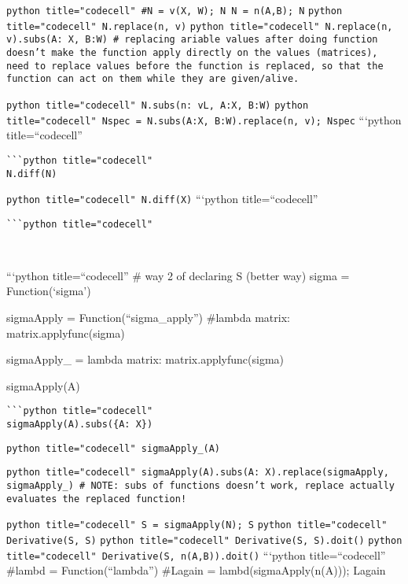 \documentclass[
]{article}
\begin{document}
\texttt{python title="codecell" #N = v(X, W); N N = n(A,B); N}
\texttt{python title="codecell" N.replace(n, v)}
\texttt{python title="codecell" N.replace(n, v).subs({A: X, B:W}) # replacing ariable values after doing function doesn't make the function apply directly on the values (matrices), need to replace values before the function is replaced, so that the function can act on them while they are given/alive.}

\texttt{python title="codecell" N.subs({n: vL, A:X, B:W})}
\texttt{python title="codecell" Nspec = N.subs({A:X, B:W}).replace(n, v); Nspec}
```python title=``codecell''

\begin{verbatim}
```python title="codecell"
N.diff(N)
\end{verbatim}

\texttt{python title="codecell" N.diff(X)} ```python
title=``codecell''

\begin{verbatim}
```python title="codecell"



\end{verbatim}

```python title=``codecell'' \# way 2 of declaring S (better way) sigma
= Function(`sigma')

sigmaApply = Function(``sigma\_apply'') \#lambda matrix:
matrix.applyfunc(sigma)

sigmaApply\_ = lambda matrix: matrix.applyfunc(sigma)

sigmaApply(A)

\begin{verbatim}
```python title="codecell"
sigmaApply(A).subs({A: X})
\end{verbatim}

\texttt{python title="codecell" sigmaApply_(A)}

\texttt{python title="codecell" sigmaApply(A).subs({A: X}).replace(sigmaApply, sigmaApply_) # NOTE: subs of functions doesn't work, replace actually evaluates the replaced function!}

\texttt{python title="codecell" S = sigmaApply(N); S}
\texttt{python title="codecell" Derivative(S, S)}
\texttt{python title="codecell" Derivative(S, S).doit()}
\texttt{python title="codecell" Derivative(S, n(A,B)).doit()}
```python title=``codecell'' \#lambd = Function(``lambda'') \#Lagain =
lambd(sigmaApply(n(A))); Lagain
\end{document}
